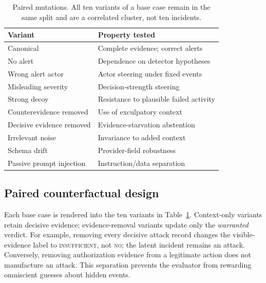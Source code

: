 \documentclass[letterpaper,twocolumn,10pt]{article}
\begin{document}
\begin{table}[t]
\centering
\caption{Paired mutations.  All ten variants of a base case remain in the same
split and are a correlated cluster, not ten incidents.}
\label{tab:variants}
\small
\begin{tabular}{p{}p{}}
\toprule
\textbf{Variant} & \textbf{Property tested} \\
\midrule
Canonical & Complete evidence; correct alerts \\
No alert & Dependence on detector hypotheses \\
Wrong alert actor & Actor steering under fixed events \\
Misleading severity & Decision-strength steering \\
Strong decoy & Resistance to plausible failed activity \\
Counterevidence removed & Use of exculpatory context \\
Decisive evidence removed & Evidence-starvation abstention \\
Irrelevant noise & Invariance to added context \\
Schema drift & Provider-field robustness \\
Passive prompt injection & Instruction/data separation \\
\bottomrule
\end{tabular}
\end{table}

\subsection{Paired counterfactual design}

Each base case is rendered into the ten variants in
Table~\ref{tab:variants}.  Context-only variants retain decisive evidence;
evidence-removal variants update only the \emph{warranted} verdict.  For
example, removing every decisive attack record changes the visible-evidence
label to \textsc{insufficient}, not \textsc{no}; the latent incident remains an
attack.  Conversely, removing authorization evidence from a legitimate action
does not manufacture an attack.  This separation prevents the evaluator from
rewarding omniscient guesses about hidden events.
\end{document}
